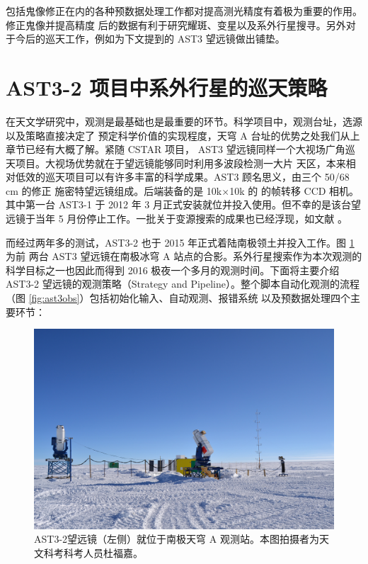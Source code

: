 包括鬼像修正在内的各种预数据处理工作都对提高测光精度有着极为重要的作用。修正鬼像并提高精度
后的数据有利于研究耀斑、变星以及系外行星搜寻\cite{Liang2016,Yang2015,Wang2014CSTAR}。另外对于今后的巡天工作，例如为下文提到的 AST3 望远镜做出铺垫\cite{Cui2008}。


\section{AST3-2 项目中系外行星的巡天策略} \label{sec:ast3}

在天文学研究中，观测是最基础也是最重要的环节。科学项目中，观测台址，选源以及策略直接决定了
预定科学价值的实现程度，天穹 A 台址的优势之处我们从上章节已经有大概了解。紧随 CSTAR 项目，
AST3 望远镜同样一个大视场广角巡天项目。大视场优势就在于望远镜能够同时利用多波段检测一大片
天区，本来相对低效的巡天项目可以有许多丰富的科学成果。AST3 顾名思义，由三个 50/68 cm 的修正
施密特望远镜组成。后端装备的是 10k$\times$10k 的 的帧转移 CCD 相机。其中第一台 AST3-1 于 2012 年 3 月正式安装就位并投入使用。但不幸的是该台望远镜于当年 5 月份停止工作。一批关于变源搜索的成果也已经浮现，如文献 \cite{Li2015,Wang2017}。

而经过两年多的测试，AST3-2 也于 2015 年正式着陆南极领土并投入工作。图 \ref{fig:ast3tele} 为前
两台 AST3 望远镜在南极冰穹 A 站点的合影。系外行星搜索作为本次观测的科学目标之一也因此而得到 
2016 极夜一个多月的观测时间。下面将主要介绍 AST3-2 望远镜的观测策略（Strategy and 
Pipeline）。整个脚本自动化观测的流程（图 \ref{fig:ast3obs}）包括初始化输入、自动观测、报错系统
以及预数据处理四个主要环节：


\begin{figure}[t]
\centering
\includegraphics[width=1.0\textwidth]{figures/chapter2/f11_ast3.jpg}
\caption{AST3-2望远镜（左侧）就位于南极天穹 A 观测站。本图拍摄者为天文科考科考人员杜福嘉。}
\label{fig:ast3tele}
\end{figure}

